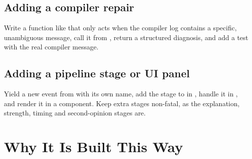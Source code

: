\section{Adding a compiler repair}
Write a function like  that only acts when the compiler log contains a specific, unambiguous message, call it from , return a structured diagnosis, and add a test with the real compiler message.

\section{Adding a pipeline stage or UI panel}
Yield a new event from  with its own  name, add the stage to  in , handle it in , and render it in a component. Keep extra stages non-fatal, as the explanation, strength, timing and second-opinion stages are.

\chapter{Why It Is Built This Way}
\label{ch:why}

